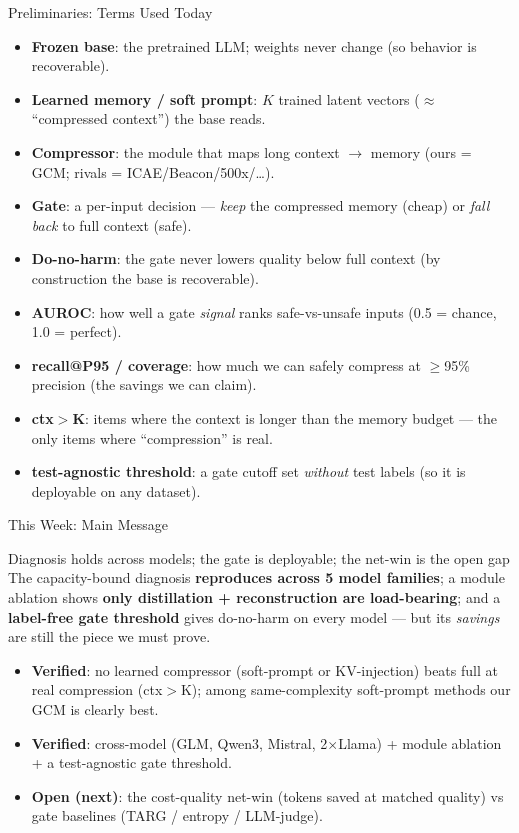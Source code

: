 \begin{frame}{Preliminaries: Terms Used Today}
  \small
  \begin{itemize}
    \item \textbf{Frozen base}: the pretrained LLM; weights never change (so behavior is recoverable).
    \item \textbf{Learned memory / soft prompt}: $K$ trained latent vectors ($\approx$ ``compressed context'') the base reads.
    \item \textbf{Compressor}: the module that maps long context $\to$ memory (ours = GCM; rivals = ICAE/Beacon/500x/\dots).
    \item \textbf{Gate}: a per-input decision --- \emph{keep} the compressed memory (cheap) or \emph{fall back} to full context (safe).
    \item \textbf{Do-no-harm}: the gate never lowers quality below full context (by construction the base is recoverable).
    \item \textbf{AUROC}: how well a gate \emph{signal} ranks safe-vs-unsafe inputs (0.5 = chance, 1.0 = perfect).
    \item \textbf{recall@P95 / coverage}: how much we can safely compress at $\ge$95\% precision (the savings we can claim).
    \item \textbf{ctx$>$K}: items where the context is longer than the memory budget --- the only items where ``compression'' is real.
    \item \textbf{test-agnostic threshold}: a gate cutoff set \emph{without} test labels (so it is deployable on any dataset).
  \end{itemize}
\end{frame}

\begin{frame}{This Week: Main Message}
  \begin{block}{Diagnosis holds across models; the gate is deployable; the net-win is the open gap}
    The capacity-bound diagnosis \textbf{reproduces across 5 model families}; a module ablation shows \textbf{only
    distillation + reconstruction are load-bearing}; and a \textbf{label-free gate threshold} gives do-no-harm on
    every model --- but its \emph{savings} are still the piece we must prove.
  \end{block}
  \begin{itemize}
    \item \textbf{Verified}: no learned compressor (soft-prompt or KV-injection) beats full at real compression (ctx$>$K); among same-complexity soft-prompt methods our GCM is clearly best.
    \item \textbf{Verified}: cross-model (GLM, Qwen3, Mistral, 2$\times$Llama) + module ablation + a test-agnostic gate threshold.
    \item \textbf{Open (next)}: the cost-quality net-win (tokens saved at matched quality) vs gate baselines (TARG / entropy / LLM-judge).
  \end{itemize}
\end{frame}

